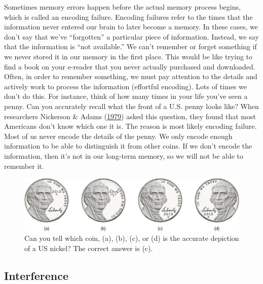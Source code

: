 \documentclass[
]{krantz}
\begin{document}
Sometimes memory errors happen before the actual memory process begins, which is called an encoding failure. Encoding failures refer to the times that the information never entered our brain to later become a memory. In these cases, we don't say that we've ``forgotten'' a particular piece of information. Instead, we say that the information is ``not available.'' We can't remember or forget something if we never stored it in our memory in the first place. This would be like trying to find a book on your e-reader that you never actually purchased and downloaded. Often, in order to remember something, we must pay attention to the details and actively work to process the information (effortful encoding). Lots of times we don't do this. For instance, think of how many times in your life you've seen a penny. Can you accurately recall what the front of a U.S. penny looks like? When researchers Nickerson \& Adams (\protect\hyperlink{ref-Nickerson1979}{1979}) asked this question, they found that most Americans don't know which one it is. The reason is most likely encoding failure. Most of us never encode the details of the penny. We only encode enough information to be able to distinguish it from other coins. If we don't encode the information, then it's not in our long-term memory, so we will not be able to remember it.

\begin{figure}

{\centering \includegraphics[width=0.8\linewidth]{images/ch6/fig3} 

}

\caption{Can you tell which coin, (a), (b), (c), or (d) is the accurate depiction of a US nickel? The correct answer is (c).}\label{fig:nickel}
\end{figure}

\hypertarget{interference}{%
\subsection*{Interference}\label{interference}}
\end{document}
